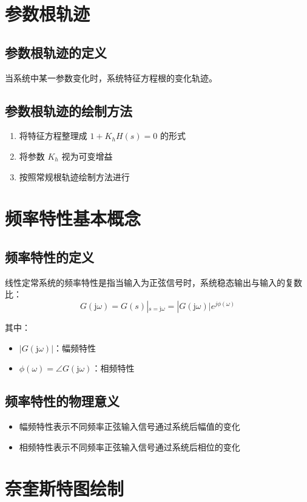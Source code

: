 \documentclass[12pt,a4paper]{article}
\newcommand{\jw}{\mathrm{j}\omega}
\begin{document}
\section{参数根轨迹}

\subsection{参数根轨迹的定义}
当系统中某一参数变化时，系统特征方程根的变化轨迹。

\subsection{参数根轨迹的绘制方法}
\begin{enumerate}
    \item 将特征方程整理成 $1 + K_h H(s) = 0$ 的形式
    \item 将参数 $K_h$ 视为可变增益
    \item 按照常规根轨迹绘制方法进行
\end{enumerate}

\section{频率特性基本概念}

\subsection{频率特性的定义}
线性定常系统的频率特性是指当输入为正弦信号时，系统稳态输出与输入的复数比：
\[G(\jw) = G(s)|_{s=\jw} = |G(\jw)|e^{j\phi(\omega)}\]

其中：
\begin{itemize}
    \item $|G(\jw)|$：幅频特性
    \item $\phi(\omega) = \angle G(\jw)$：相频特性
\end{itemize}

\subsection{频率特性的物理意义}
\begin{itemize}
    \item 幅频特性表示不同频率正弦输入信号通过系统后幅值的变化
    \item 相频特性表示不同频率正弦输入信号通过系统后相位的变化
\end{itemize}

\section{奈奎斯特图绘制}
\end{document}
